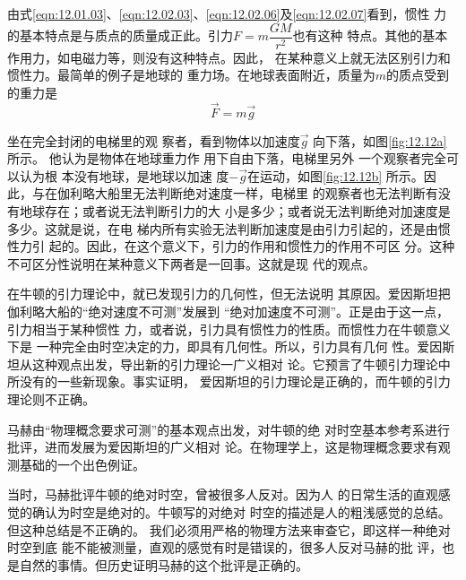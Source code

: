 由式\eqref{eqn:12.01.03}、\eqref{eqn:12.02.03}、\eqref{eqn:12.02.06}及\eqref{eqn:12.02.07}看到，惯性
力的基本特点是与质点的质量成正此。引力$ F = m \dfrac { G M } { r ^ { 2 } }  $也有这种
特点。其他的基本作用力，如电磁力等，则没有这种特点。因此，
在某种意义上就无法区别引力和惯性力。最简单的例子是地球的
重力场。在地球表面附近，质量为$ m $的质点受到的重力是
\begin{equation*}
    \vec{F} = m \vec{g}
\end{equation*}
\begin{figure}
    \vspace{-2em}
    \centering
    \caption{}
    \label{fig:12.12}
\end{figure}
坐在完全封闭的电梯里的观
察者，看到物体以加速度$ \vec{g} $
向下落，如图\ref{fig:12.12a}所示。
他认为是物体在地球重力作
用下自由下落，电梯里另外
一个观察者完全可以认为根
本没有地球，是地球以加速
度$-\vec{g}$在运动，如图\ref{fig:12.12b}
所示。因此，与在伽利略大船里无法判断绝对速度一样，电梯里
的观察者也无法判断有没有地球存在；或者说无法判断引力的大
小是多少；或者说无法判断绝对加速度是多少。这就是说，在电
梯内所有实验无法判断加速度是由引力引起的，还是由惯性力引
起的。因此，在这个意义下，引力的作用和惯性力的作用不可区
分。这种不可区分性说明在某种意义下两者是一回事。这就是现
代的观点。

在牛顿的引力理论中，就已发现引力的几何性，但无法说明
其原因。爱因斯坦把伽利略大船的“绝对速度不可测”发展到
“绝对加速度不可测”。正是由于这一点，引力相当于某种惯性
力，或者说，引力具有惯性力的性质。而惯性力在牛顿意义下是
一种完全由时空决定的力，即具有几何性。所以，引力具有几何
性。爱因斯坦从这种观点出发，导出新的引力理论一广义相对
论。它预言了牛顿引力理论中所没有的一些新现象。事实证明，
爱因斯坦的引力理论是正确的，而牛顿的引力理论则不正确。

{马\ziju{-0.005pt}赫由“物理概念要求可测”的基本观点出发，对牛顿的绝
对时空基本参考系进行批评，进而发展为爱因斯坦的广义相对
论。在物理学上，这是物理概念要求有观测基础的一个出色例证。}

当时，马赫批评牛顿的绝对时空，曾被很多人反对。因为人
的日常生活的直观感觉的确认为时空是绝对的。牛顿写的对绝对
时空的描述是人的粗浅感觉的总结。但这种总结是不正确的。
我们必须用严格的物理方法来审查它，即这样一种绝对时空到底
能不能被测量，直观的感觉有时是错误的，很多人反对马赫的批
评，也是自然的事情。但历史证明马赫的这个批评是正确的。